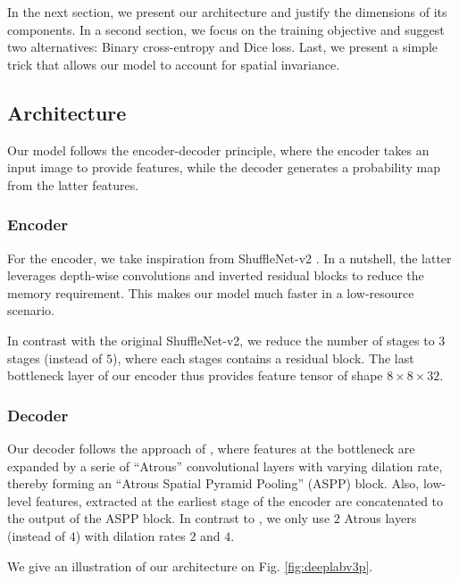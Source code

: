 \documentclass[11pt]{article}
\begin{document}
In the next section, we present our architecture and justify the dimensions of
its components.
In a second section, we focus on the training objective and suggest two alternatives: Binary cross-entropy and Dice loss.
Last, we present a simple trick that allows our model to account for spatial invariance.

\subsection{Architecture}
\label{sec:orga27dfa8}

Our model follows the encoder-decoder principle, where the encoder
takes an input image to provide
features, while the decoder generates a probability map from the latter features.

\subsubsection{Encoder}
\label{sec:orgf282f0d}

For the encoder, we take inspiration from ShuffleNet-v2 \cite{ma18}.
In a nutshell, the latter leverages depth-wise convolutions and
inverted residual blocks to reduce the memory requirement.
This makes our model much faster in a low-resource scenario.

In contrast with the original ShuffleNet-v2, we reduce the number
of stages to \(3\) stages (instead of \(5\)), where each stages contains a
residual block.
The last bottleneck layer of our encoder thus provides feature tensor of shape \(8\times8\times32\).

\subsubsection{Decoder}
\label{sec:org477c665}

Our decoder follows the approach of \cite{chen18}, where features at the bottleneck
are expanded by a serie of ``Atrous'' convolutional layers with varying dilation rate, thereby forming an ``Atrous Spatial Pyramid Pooling'' (ASPP) block.
Also, low-level features, extracted at the earliest stage of the encoder are concatenated
to the output of the ASPP block.
In contrast to \cite{chen18}, we only use \(2\) Atrous layers (instead of \(4\)) with dilation
rates \(2\) and \(4\).

We give an illustration of our architecture on Fig. \ref{fig:deeplabv3p}.
\end{document}
